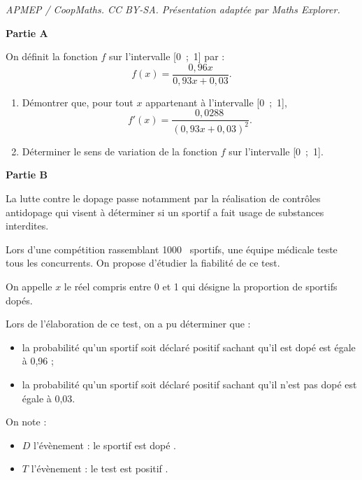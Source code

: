\documentclass[10pt]{article}
\providecommand{\np}[2][]{{#2~#1}}
\begin{document}
\noindent\textit{APMEP / CoopMaths. CC BY-SA. Présentation adaptée par Maths Explorer.}\par\medskip
\medskip

\textbf{Partie A}

\medskip

On définit la fonction $f$ sur l'intervalle [0~;~1] par :
\[f(x) = \dfrac{0,96x}{0,93x + 0,03}.\]

\smallskip

\begin{enumerate}
\item Démontrer que, pour tout $x$ appartenant à l'intervalle [0~;~1], 
\[f'(x) = \dfrac{\np{0,0288}}{(0,93x + 0,03)^2}.\]

\item Déterminer le sens de variation de la fonction $f$ sur l'intervalle [0~;~1].
\end{enumerate}

\medskip

\textbf{Partie B}

La lutte contre le dopage passe notamment par la réalisation de contrôles antidopage qui visent à déterminer si un sportif a fait usage de substances interdites.

Lors d'une compétition rassemblant \np{1000} sportifs, une équipe médicale teste tous les concurrents. On propose d'étudier la fiabilité de ce test.

On appelle $x$ le réel compris entre 0 et 1 qui désigne la proportion de sportifs dopés.

Lors de l'élaboration de ce test, on a pu déterminer que :

\begin{itemize}[label=$\bullet~$]
\item la probabilité qu'un sportif soit déclaré positif sachant qu'il est dopé est égale
à 0,96 ;
\item  la probabilité qu'un sportif soit déclaré positif sachant qu'il n'est pas dopé est égale à 0,03.
\end{itemize}

On note :

\begin{itemize}[label=$\bullet~$]
\item $D$ l'évènement : \og le sportif est dopé \fg.
\item $T$ l'évènement : \og le test est positif \fg.
\end{itemize}

\medskip
\end{document}
